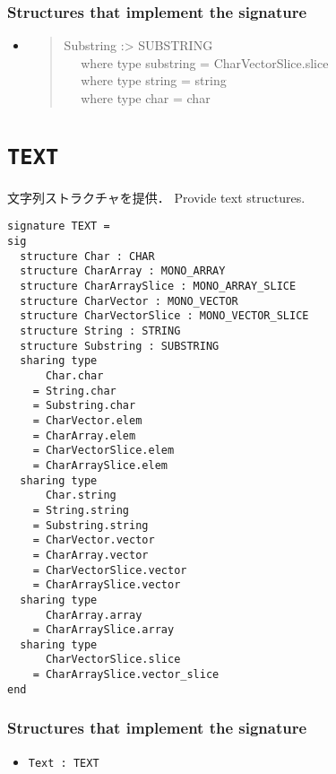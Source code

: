 \documentclass{jbook}
\newcommand{\txt}[2]{#2}
\newcommand{\code}[1]{\mbox{\large\tt #1}}
\newcommand{\myem}{\mbox{\ \ }}
\newenvironment{program}{\begin{quote}\begin{tt}}%
                        {\end{tt}\end{quote}}
\newcommand{\signature}[2]{
\section{{\tt #1}}\label{section:reference:#2}
}
\newcommand{\Structure}{\subsubsection*{\txt{シグネチャを実装するストラクチャ}{Structures that implement the signature}}}
\begin{document}
\Structure
\begin{itemize}
\item 
\begin{program}
Substring :> SUBSTRING
\\\myem
where type substring = CharVectorSlice.slice 
\\\myem
where type string = string 
\\\myem
where type char = char
\end{program}
\end{itemize}

\signature{TEXT}{TEXT}
\ifjp%
	文字列ストラクチャを提供．
\else%
	Provide text structures.
\fi%

\begin{verbatim}
signature TEXT =
sig
  structure Char : CHAR
  structure CharArray : MONO_ARRAY
  structure CharArraySlice : MONO_ARRAY_SLICE
  structure CharVector : MONO_VECTOR
  structure CharVectorSlice : MONO_VECTOR_SLICE
  structure String : STRING
  structure Substring : SUBSTRING
  sharing type
      Char.char
    = String.char
    = Substring.char
    = CharVector.elem
    = CharArray.elem
    = CharVectorSlice.elem
    = CharArraySlice.elem
  sharing type
      Char.string
    = String.string
    = Substring.string
    = CharVector.vector
    = CharArray.vector
    = CharVectorSlice.vector
    = CharArraySlice.vector
  sharing type
      CharArray.array
    = CharArraySlice.array
  sharing type
      CharVectorSlice.slice
    = CharArraySlice.vector_slice
end
\end{verbatim}

\Structure
\begin{itemize}
\item \code{Text : TEXT}
\end{itemize}
\end{document}
